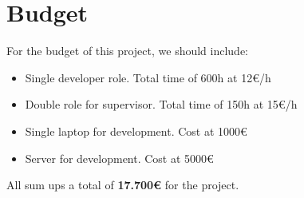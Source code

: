 \clearpage\section{Budget}
For the budget of this project, we should include:
\begin{itemize}
	\item{Single developer role. Total time of 600h at 12€/h}
	\item{Double role for supervisor. Total time of 150h at 15€/h}
	\item{Single laptop for development. Cost at 1000€}
	\item{Server for development. Cost at 5000€}
\end{itemize}
All sum ups a total of \textbf{17.700€} for the project.
